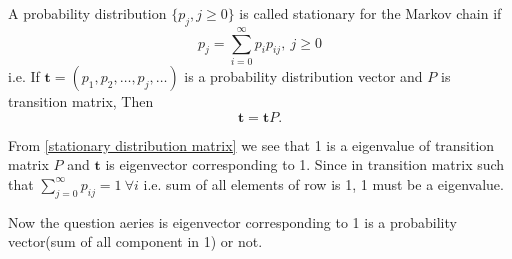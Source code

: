 \begin{definition}
    \label{Stationary distribution}
    A probability distribution $ \{p_{j},j\ge 0\} $ is called stationary for the Markov chain if 
    \begin{equation}
        \label{1st stationary distribution}
        p_{j} = \sum_{i=0}^{\infty} p_{i}p_{ij},\ j \ge 0
    \end{equation}
    i.e. If $ \mathbf{t}=(p_{1},p_{2},\ldots,p_{j},\ldots) $ is a probability distribution vector and $ P $ is transition matrix, Then
    \begin{equation}
        \label{stationary distribution matrix}
         \mathbf{t}=\mathbf{t}P.
    \end{equation}
\end{definition}

From \cref{stationary distribution matrix} we see that 1 is a eigenvalue of transition matrix $ P $ and  $ \mathbf{t} $ is eigenvector corresponding
to 1. Since in transition matrix  such that  $ \sum_{j=0}^{\infty} p_{ij} = 1\ \forall i$ i.e. sum of all elements of row is 1,
1 must be a eigenvalue.

Now the question aeries is eigenvector corresponding to 1 is a probability vector(sum of all component in 1) or not.

